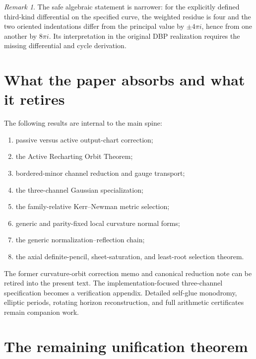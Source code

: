 \documentclass[11pt]{article}
\theoremstyle{remark}
\newtheorem{remark}[theorem]{Remark}
\begin{document}
\begin{remark}
The safe algebraic statement is narrower: for the explicitly defined
third-kind differential on the specified curve, the weighted residue is
four and the two oriented indentations differ from the principal value by
$\pm4\pi i$, hence from one another by $8\pi i$. Its interpretation in the
original DBP realization requires the missing differential and cycle derivation.
\end{remark}

\section{What the paper absorbs and what it retires}

The following results are internal to the main spine:
\begin{enumerate}
\item passive versus active output-chart correction;
\item the Active Recharting Orbit Theorem;
\item bordered-minor channel reduction and gauge transport;
\item the three-channel Gaussian specialization;
\item the family-relative Kerr--Newman metric selection;
\item generic and parity-fixed local curvature normal forms;
\item the generic normalization--reflection chain;
\item the axial definite-pencil, sheet-saturation, and least-root
selection theorem.
\end{enumerate}

The former curvature-orbit correction memo and canonical reduction note can
be retired into the present text. The implementation-focused three-channel
specification becomes a verification appendix. Detailed self-glue
monodromy, elliptic periods, rotating horizon reconstruction, and full
arithmetic certificates remain companion work.

\section{The remaining unification theorem}
\end{document}
